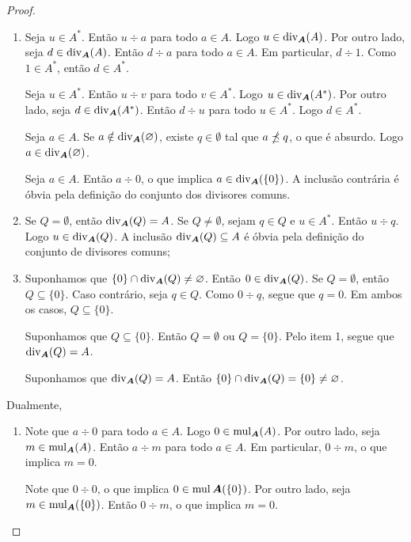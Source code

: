 \begin{proof}
	\begin{enumerate}
	\item Seja $u \in A^*$. Então $u \div a$ para todo $a \in A$. Logo $u \in \operatorname{div}_{\bm A}(A)$. Por outro lado, seja $d \in \operatorname{div}_{\bm A}(A)$. Então $d \div a$ para todo $a \in A$. Em particular, $d \div 1$. Como $1 \in A^*$, então $d \in A^*$.

	Seja $u \in A^*$. Então $u \div v$ para todo $v \in A^*$. Logo $u \in \operatorname{div}_{\bm A}(A^*)$. Por outro lado, seja $d \in \operatorname{div}_{\bm A}(A^*)$. Então $d \div u$ para todo $u \in A^*$. Logo $d \in A^*$.

	Seja $a \in A$. Se $a \notin \operatorname{div}_{\bm A}(\varnothing)$, existe $q \in \emptyset$ tal que $a \npreceq q$, o que é absurdo. Logo $a \in \operatorname{div}_{\bm A}(\varnothing)$.

	Seja $a \in A$. Então $a \div 0$, o que implica $a \in \operatorname{div}_{\bm A}(\{0\})$. A inclusão contrária é óbvia pela definição do conjunto dos divisores comuns.

	\item Se $Q = \emptyset$, então $\operatorname{div}_{\bm A}(Q) = A$. Se $Q \neq \emptyset$, sejam $q \in Q$ e $u \in A^*$. Então $u \div q$. Logo $u \in \operatorname{div}_{\bm A}(Q)$. A inclusão $\operatorname{div}_{\bm A}(Q) \subseteq A$ é óbvia pela definição do conjunto de divisores comuns;

	\item Suponhamos que $\{0\} \cap \operatorname{div}_{\bm A}(Q) \neq \varnothing$. Então $0 \in \operatorname{div}_{\bm A}(Q)$. Se $Q = \emptyset$, então $Q \subseteq \{0\}$. Caso contrário, seja $q \in Q$. Como $0 \div q$, segue que $q=0$. Em ambos os casos, $Q \subseteq \{0\}$.

	Suponhamos que $Q \subseteq \{0\}$. Então $Q=\emptyset$ ou $Q=\{0\}$. Pelo item 1, segue que $\operatorname{div}_{\bm A}(Q)=A$.

	Suponhamos que $\operatorname{div}_{\bm A}(Q)=A$. Então $\{0\} \cap \operatorname{div}_{\bm A}(Q) = \{0\} \neq \varnothing$.
	\end{enumerate}

	Dualmente,
	\begin{enumerate}
	\item Note que $a \div 0$ para todo $a \in A$. Logo $0 \in \operatorname{mul}_{\bm A}(A)$. Por outro  lado, seja $m \in \operatorname{mul}_{\bm A}(A)$. Então $a \div m$ para todo $a \in A$. Em particular, $0 \div m$, o que implica $m=0$.

	Note que $0 \div 0$, o que implica $0 \in \operatorname{mul}{\bm A}(\{0\})$. Por outro lado, seja $m \in \operatorname{mul}_{\bm A}(\{0\})$. Então $0 \div m$, o que implica $m=0$.


\end{enumerate}
\end{proof}
